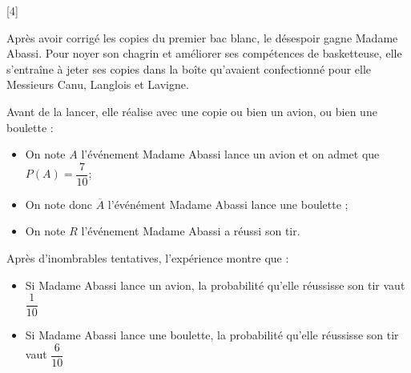 \documentclass{controle}
\begin{document}
\begin{questions}
\begin{solution}
\end{solution}
\newpage




[4]

Après avoir corrigé les copies du premier bac blanc, le désespoir gagne Madame Abassi. Pour noyer son chagrin et améliorer ses compétences de basketteuse, elle s’entraîne à jeter ses copies dans la boîte qu’avaient confectionné pour elle Messieurs Canu, Langlois et Lavigne.

\vspace*{0.5cm}

Avant de la lancer, elle réalise avec une copie ou bien un avion, ou bien une boulette :
\begin{itemize}
\item On note $A$ l'événement \og Madame Abassi lance un avion \fg{} et on admet que $P(A) = \dfrac{7}{10}$;
\item On note donc $\overbar{A}$ l'événément \og Madame Abassi lance une boulette \fg;
\item On note $R$ l'événement \og Madame Abassi a réussi son tir\fg. 
\end{itemize}

\vspace*{0.5cm}

Après d'inombrables tentatives, l'expérience montre que :
\begin{itemize}
\item Si Madame Abassi lance un avion, la probabilité qu'elle réussisse son tir vaut $\dfrac{1}{10}$ 
\item Si Madame Abassi lance une boulette, la probabilité qu'elle réussisse son tir vaut $\dfrac{6}{10}$ 
\end{itemize}


\end{questions}
\end{document}
